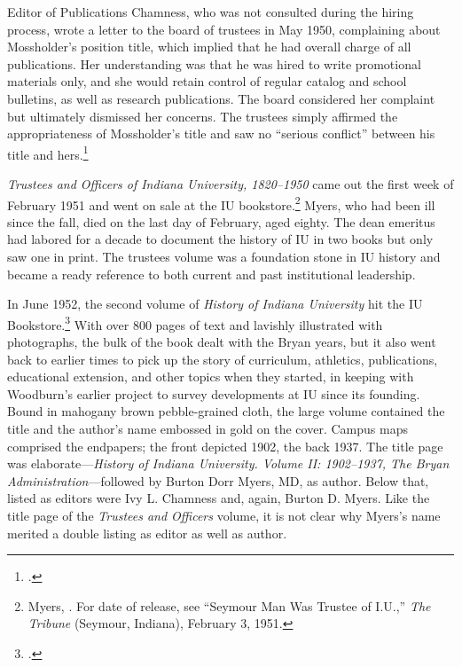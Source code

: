 \documentclass[
  american,
  letterpaper,
]{scrreprt}
\begin{document}
Editor of Publications Chamness, who was not consulted during the hiring
process, wrote a letter to the board of trustees in May 1950,
complaining about Mossholder's position title, which implied that he had
overall charge of all publications. Her understanding was that he was
hired to write promotional materials only, and she would retain control
of regular catalog and school bulletins, as well as research
publications. The board considered her complaint but ultimately
dismissed her concerns. The trustees simply affirmed the appropriateness
of Mossholder's title and saw no ``serious conflict'' between his title
and hers.\footnote{.}

\emph{Trustees and Officers of Indiana University, 1820--1950} came out
the first week of February 1951 and went on sale at the IU
bookstore.\footnote{Myers, . For date of
  release, see ``Seymour Man Was Trustee of I.U.,'' \emph{The Tribune}
  (Seymour, Indiana), February 3, 1951.} Myers, who had been ill since
the fall, died on the last day of February, aged eighty. The dean
emeritus had labored for a decade to document the history of IU in two
books but only saw one in print. The trustees volume was a foundation
stone in IU history and became a ready reference to both current and
past institutional leadership.

In June 1952, the second volume of \emph{History of Indiana University}
hit the IU Bookstore.\footnote{.} With over 800 pages of
text and lavishly illustrated with photographs, the bulk of the book
dealt with the Bryan years, but it also went back to earlier times to
pick up the story of curriculum, athletics, publications, educational
extension, and other topics when they started, in keeping with
Woodburn's earlier project to survey developments at IU since its
founding. Bound in mahogany brown pebble-grained cloth, the large volume
contained the title and the author's name embossed in gold on the cover.
Campus maps comprised the endpapers; the front depicted 1902, the back
1937. The title page was elaborate---\emph{History of Indiana
University. Volume II: 1902--1937, The Bryan Administration}---followed
by Burton Dorr Myers, MD, as author. Below that, listed as editors were
Ivy L. Chamness and, again, Burton D. Myers. Like the title page of the
\emph{Trustees and Officers} volume, it is not clear why Myers's name
merited a double listing as editor as well as author.
\end{document}
